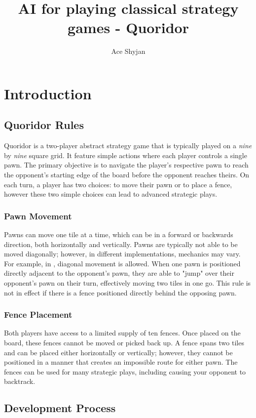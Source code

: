 \documentclass[review]{cmpreport}
\title{AI for playing classical strategy games - Quoridor}
\author{Ace Shyjan}
\begin{document}
\section{Introduction}

\subsection{Quoridor Rules}
Quoridor is a two-player abstract strategy game that is typically played on a \textit{nine} by \textit{nine} square grid. It feature simple actions where each player controls a single pawn. The primary objective is to navigate the player's respective pawn to reach the opponent’s starting edge of the board before the opponent reaches theirs. On each turn, a player has two choices: to move their pawn or to place a fence, however these two simple choices can lead to advanced strategic plays.

\subsubsection{Pawn Movement}
Pawns can move one tile at a time, which can be in a forward or backwards direction, both horizontally and vertically. Pawns are typically not able to be moved diagonally; however, in different implementations, mechanics may vary. For example, in \cite{glendenning2005mastering}, diagonal movement is allowed. When one pawn is positioned directly adjacent to the opponent's pawn, they are able to "jump" over their opponent's pawn on their turn, effectively moving two tiles in one go. This rule is not in effect if there is a fence positioned directly behind the opposing pawn.

\subsubsection{Fence Placement}
Both players have access to a limited supply of ten fences. Once placed on the board, these fences cannot be moved or picked back up. A fence spans two tiles and can be placed either horizontally or vertically; however, they cannot be positioned in a manner that creates an impossible route for either pawn. The fences can be used for many strategic plays, including causing your opponent to backtrack.

\subsection{Development Process}
\end{document}
